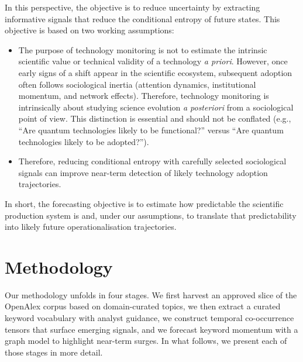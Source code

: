 \documentclass[pdflatex,sn-basic]{sn-jnl}
\begin{document}
In this perspective, the objective is to reduce uncertainty by extracting informative signals that reduce the conditional entropy of future states. This objective is based on two working assumptions:
\begin{itemize}
  \item The purpose of technology monitoring is not to estimate the intrinsic scientific value or technical validity of a technology \emph{a priori}.
  However, once early signs of a shift appear in the scientific ecosystem, subsequent adoption often follows sociological inertia (attention dynamics, institutional momentum, and network effects). Therefore, technology monitoring is intrinsically about studying science evolution \emph{a posteriori} from a sociological point of view. This distinction is essential and should not be conflated (e.g., ``Are quantum technologies likely to be functional?'' versus ``Are quantum technologies likely to be adopted?'').
  \item Therefore, reducing conditional entropy with carefully selected sociological signals can improve near-term detection of likely technology adoption trajectories.
\end{itemize}

In short, the forecasting objective is to estimate how predictable the scientific production system is and, under our assumptions, to translate that predictability into likely future operationalisation trajectories.


\section{Methodology}
Our methodology unfolds in four stages.
We first harvest an approved slice of the OpenAlex corpus based on domain-curated topics,
we then extract a curated keyword vocabulary with analyst guidance,
we construct temporal co-occurrence tensors that surface emerging signals,
and we forecast keyword momentum with a graph model to highlight near-term surges.
In what follows, we present each of those stages in more detail.
\end{document}
